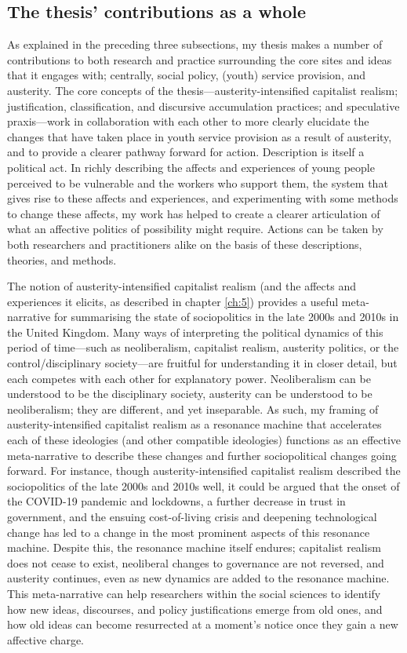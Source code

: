 \subsection{The thesis' contributions as a whole}
As explained in the preceding three subsections, my thesis makes a number of contributions to both research and practice surrounding the core sites and ideas that it engages with; centrally, social policy, (youth) service provision, and austerity. The core concepts of the thesis—austerity-intensified capitalist realism; justification, classification, and discursive accumulation practices; and speculative praxis—work in collaboration with each other to more clearly elucidate the changes that have taken place in youth service provision as a result of austerity, and to provide a clearer pathway forward for action. Description is itself a political act. In richly describing the affects and experiences of young people perceived to be vulnerable and the workers who support them, the system that gives rise to these affects and experiences, and experimenting with some methods to change these affects, my work has helped to create a clearer articulation of what an affective politics of possibility might require. Actions can be taken by both researchers and practitioners alike on the basis of these descriptions, theories, and methods. 

The notion of austerity-intensified capitalist realism (and the affects and experiences it elicits, as described in chapter \ref{ch:5}) provides a useful meta-narrative for summarising the state of sociopolitics in the late 2000s and 2010s in the United Kingdom. Many ways of interpreting the political dynamics of this period of time—such as neoliberalism, capitalist realism, austerity politics, or the control/disciplinary society—are fruitful for understanding it in closer detail, but each competes with each other for explanatory power. Neoliberalism can be understood to be the disciplinary society, austerity can be understood to be neoliberalism; they are different, and yet inseparable. As such, my framing of austerity-intensified capitalist realism as a resonance machine that accelerates each of these ideologies (and other compatible ideologies) functions as an effective meta-narrative to describe these changes and further sociopolitical changes going forward. For instance, though austerity-intensified capitalist realism described the sociopolitics of the late 2000s and 2010s well, it could be argued that the onset of the COVID-19 pandemic and lockdowns, a further decrease in trust in government, and the ensuing cost-of-living crisis and deepening technological change has led to a change in the most prominent aspects of this resonance machine. Despite this, the resonance machine itself endures; capitalist realism does not cease to exist, neoliberal changes to governance are not reversed, and austerity continues, even as new dynamics are added to the resonance machine. This meta-narrative can help researchers within the social sciences to identify how new ideas, discourses, and policy justifications emerge from old ones, and how old ideas can become resurrected at a moment's notice once they gain a new affective charge.

